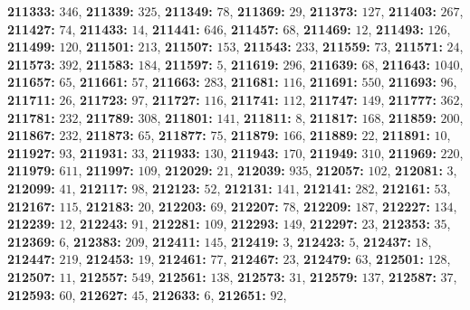 \textsf{\bfseries 211333:} $346$, \textsf{\bfseries 211339:} $325$, \textsf{\bfseries 211349:} $78$, \textsf{\bfseries 211369:} $29$, \textsf{\bfseries 211373:} $127$, \textsf{\bfseries 211403:} $267$, \textsf{\bfseries 211427:} $74$, \textsf{\bfseries 211433:} $14$, \textsf{\bfseries 211441:} $646$, \textsf{\bfseries 211457:} $68$, \textsf{\bfseries 211469:} $12$, \textsf{\bfseries 211493:} $126$, \textsf{\bfseries 211499:} $120$, \textsf{\bfseries 211501:} $213$, \textsf{\bfseries 211507:} $153$, \textsf{\bfseries 211543:} $233$, \textsf{\bfseries 211559:} $73$, \textsf{\bfseries 211571:} $24$, \textsf{\bfseries 211573:} $392$, \textsf{\bfseries 211583:} $184$, \textsf{\bfseries 211597:} $5$, \textsf{\bfseries 211619:} $296$, \textsf{\bfseries 211639:} $68$, \textsf{\bfseries 211643:} $1040$, \textsf{\bfseries 211657:} $65$, \textsf{\bfseries 211661:} $57$, \textsf{\bfseries 211663:} $283$, \textsf{\bfseries 211681:} $116$, \textsf{\bfseries 211691:} $550$, \textsf{\bfseries 211693:} $96$, \textsf{\bfseries 211711:} $26$, \textsf{\bfseries 211723:} $97$, \textsf{\bfseries 211727:} $116$, \textsf{\bfseries 211741:} $112$, \textsf{\bfseries 211747:} $149$, \textsf{\bfseries 211777:} $362$, \textsf{\bfseries 211781:} $232$, \textsf{\bfseries 211789:} $308$, \textsf{\bfseries 211801:} $141$, \textsf{\bfseries 211811:} $8$, \textsf{\bfseries 211817:} $168$, \textsf{\bfseries 211859:} $200$, \textsf{\bfseries 211867:} $232$, \textsf{\bfseries 211873:} $65$, \textsf{\bfseries 211877:} $75$, \textsf{\bfseries 211879:} $166$, \textsf{\bfseries 211889:} $22$, \textsf{\bfseries 211891:} $10$, \textsf{\bfseries 211927:} $93$, \textsf{\bfseries 211931:} $33$, \textsf{\bfseries 211933:} $130$, \textsf{\bfseries 211943:} $170$, \textsf{\bfseries 211949:} $310$, \textsf{\bfseries 211969:} $220$, \textsf{\bfseries 211979:} $611$, \textsf{\bfseries 211997:} $109$, \textsf{\bfseries 212029:} $21$, \textsf{\bfseries 212039:} $935$, \textsf{\bfseries 212057:} $102$, \textsf{\bfseries 212081:} $3$, \textsf{\bfseries 212099:} $41$, \textsf{\bfseries 212117:} $98$, \textsf{\bfseries 212123:} $52$, \textsf{\bfseries 212131:} $141$, \textsf{\bfseries 212141:} $282$, \textsf{\bfseries 212161:} $53$, \textsf{\bfseries 212167:} $115$, \textsf{\bfseries 212183:} $20$, \textsf{\bfseries 212203:} $69$, \textsf{\bfseries 212207:} $78$, \textsf{\bfseries 212209:} $187$, \textsf{\bfseries 212227:} $134$, \textsf{\bfseries 212239:} $12$, \textsf{\bfseries 212243:} $91$, \textsf{\bfseries 212281:} $109$, \textsf{\bfseries 212293:} $149$, \textsf{\bfseries 212297:} $23$, \textsf{\bfseries 212353:} $35$, \textsf{\bfseries 212369:} $6$, \textsf{\bfseries 212383:} $209$, \textsf{\bfseries 212411:} $145$, \textsf{\bfseries 212419:} $3$, \textsf{\bfseries 212423:} $5$, \textsf{\bfseries 212437:} $18$, \textsf{\bfseries 212447:} $219$, \textsf{\bfseries 212453:} $19$, \textsf{\bfseries 212461:} $77$, \textsf{\bfseries 212467:} $23$, \textsf{\bfseries 212479:} $63$, \textsf{\bfseries 212501:} $128$, \textsf{\bfseries 212507:} $11$, \textsf{\bfseries 212557:} $549$, \textsf{\bfseries 212561:} $138$, \textsf{\bfseries 212573:} $31$, \textsf{\bfseries 212579:} $137$, \textsf{\bfseries 212587:} $37$, \textsf{\bfseries 212593:} $60$, \textsf{\bfseries 212627:} $45$, \textsf{\bfseries 212633:} $6$, \textsf{\bfseries 212651:} $92$, 
